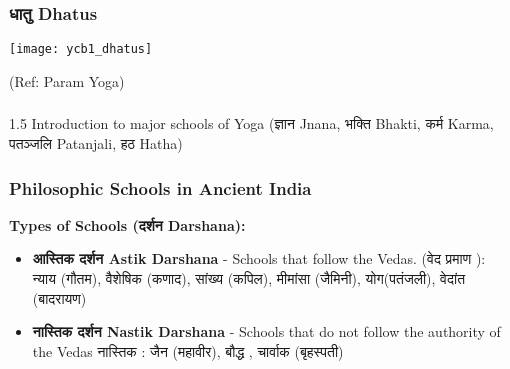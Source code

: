 \begin{frame}[fragile]\frametitle{धातु Dhatus}
        \begin{center}
        \texttt{[image: ycb1\_dhatus]}
				
		{\tiny (Ref: Param Yoga)}	 
        \end{center}	

\end{frame}


\begin{frame}[fragile]\frametitle{}
\begin{center}
{\Large 1.5 Introduction to major schools of Yoga (ज्ञान Jnana, भक्ति  Bhakti, कर्म  Karma, पतञ्जलि  Patanjali, हठ Hatha)}
\end{center}
\end{frame}

\begin{frame}[fragile]\frametitle{Philosophic Schools in Ancient India}
    \textbf{Types of Schools (दर्शन  Darshana):}
    \begin{itemize}
        \item \textbf{आस्तिक  दर्शन Astik Darshana} - Schools that follow the Vedas. (वेद प्रमाण ): न्याय (गौतम), वैशेषिक (कणाद), सांख्य (कपिल), मीमांसा (जैमिनी), योग(पतंजली), वेदांत (बादरायण)
        \item \textbf{नास्तिक  दर्शन  Nastik Darshana} - Schools that do not follow the authority of the Vedas नास्तिक : जैन (महावीर), बौद्ध , चार्वाक (बृहस्पती)
    \end{itemize}
\end{frame}


